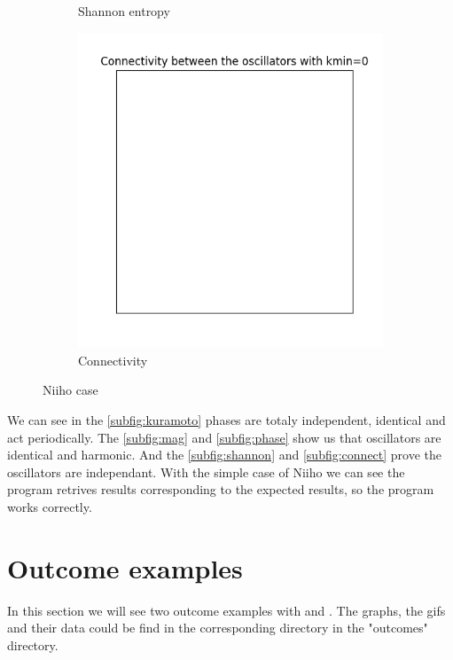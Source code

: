 \documentclass[1pt, a4paper]{article}
\begin{document}
\begin{figure}[htbp]
\begin{subfigure}{0.30\textwidth}
        \caption{Shannon entropy}
        \label{subfig:shannon}
    \end{subfigure}
    \hfill
    \begin{subfigure}{0.30\textwidth}
        \centering
        \includegraphics[scale=0.40]{figures/connectivity_Niiho.png}
        \caption{Connectivity}
        \label{subfig:connect}
    \end{subfigure}
\caption{Niiho case}
\label{Niiho}
\end{figure}
\newpage
\noindent
We can see in the \autoref{subfig:kuramoto} phases are totaly independent, identical and act periodically. The \autoref{subfig:mag} and \autoref{subfig:phase} show us that oscillators are identical and harmonic. And the \autoref{subfig:shannon} and \autoref{subfig:connect} prove the oscillators are independant. With the simple case of Niiho we can see the program retrives results corresponding to the expected results, so the program works correctly.
\section{Outcome examples}
\label{sec:5} 
In this section we will see two outcome examples with  and . The graphs, the gifs and their data could be find in the corresponding directory in the "outcomes" directory.
\end{document}
